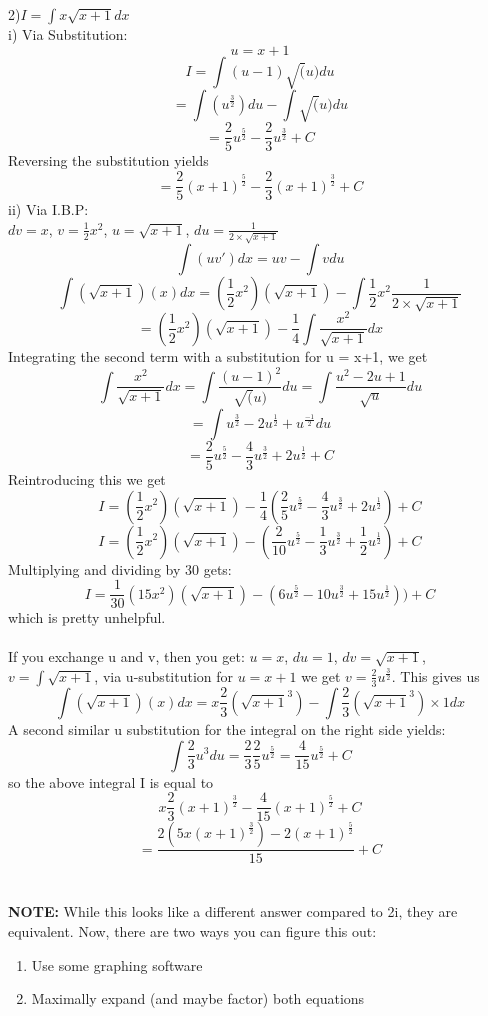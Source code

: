 \documentclass[twocolumn]{article}
\begin{document}
   2)$I = \int x \sqrt{x+1} dx $ \\
   i) Via Substitution:
   $$u = x+1$$
   $$I =\int(u-1)\sqrt(u) du$$
   $$= \int (u^{\frac{3}{2}}) du - \int \sqrt(u)du$$
   $$= \frac{2}{5} u^{\frac{5}{2}} - \frac {2}{3} u^{\frac{3}{2}} + C$$
   Reversing the substitution yields
   $$= \frac{2}{5} (x+1)^{\frac{5}{2}} - \frac {2}{3} (x+1)^{\frac{3}{2}} + C$$
   ii) Via I.B.P: \\
   $dv = x$, $v = \frac{1}{2}x^2$, $u = \sqrt{x+1}$, $du = \frac{1}{2\times \sqrt{x+1}}$
   $$\int(uv')dx = uv - \int vdu$$
   $$\int(\sqrt{x+1}) (x) dx = (\frac{1}{2}x^2)(\sqrt{x+1})-\int{\frac{1}{2}x^2} \frac{1}{2\times \sqrt{x+1}}$$
   $$= (\frac{1}{2}x^2)(\sqrt{x+1})-\frac{1}{4}\int \frac{x^2}{\sqrt{x+1}} dx$$
   Integrating the second term with a substitution for u = x+1, we get $$\int \frac{x^2}{\sqrt{x+1}}dx = \int \frac {(u-1)^2}{\sqrt(u)}du = \int \frac{u^2 - 2u + 1}{\sqrt{u}}du$$
   $$= \int u^\frac{3}{2} - 2u^\frac{1}{2} + u^\frac{-1}{2} du$$
   $$=\frac{2}{5}u^\frac{5}{2} - \frac{4}{3}u^\frac{3}{2} + 2u^\frac{1}{2} + C$$
   Reintroducing this we get
   $$I = (\frac{1}{2}x^2)(\sqrt{x+1}) - \frac{1}{4}(\frac{2}{5}u^\frac{5}{2} - \frac{4}{3}u^\frac{3}{2} + 2u^\frac{1}{2}) + C $$
   $$I = (\frac{1}{2}x^2)(\sqrt{x+1}) - (\frac{2}{10}u^\frac{5}{2} - \frac{1}{3}u^\frac{3}{2} + \frac{1}{2}u^\frac{1}{2}) +C  $$ Multiplying and dividing by 30 gets:
   $$I = \frac{1}{30}(15x^2)(\sqrt{x+1}) - (6u^\frac{5}{2} - 10u^\frac{3}{2} + 15u^\frac{1}{2})) + C$$
   which is pretty unhelpful. \\ \\If you exchange u and v, then you get:
   $u = x$, $du = 1$, $dv = \sqrt{x+1}$, $v = \int \sqrt{x+1}$, via u-substitution for $u=x+1$ we get $v = \frac{2}{3}u^\frac{3}{2}$. This gives us \\ $$\int(\sqrt{x+1}) (x) dx = x\frac {2}{3}(\sqrt{x+1}^3)-\int \frac {2}{3}(\sqrt{x+1}^3) \times 1 dx$$
   A second similar u substitution for the integral on the right side yields:
   $$\int\frac{2}{3}u^3 du = \frac{2}{3} \frac{2}{5} u^\frac{5}{2} = \frac{4}{15} u^\frac{5}{2} + C$$ so the above integral I is equal to
   $$x\frac {2}{3}(x+1)^\frac{3}{2}-\frac{4}{15} (x+1)^\frac{5}{2} + C$$
   $$= \frac{2(5x(x+1)^\frac{3}{2})-2(x+1)^\frac{5}{2}}{15} + C$$ \\\\
   \textbf{NOTE:}
   While this looks like a different answer compared to 2i, they are equivalent.  Now, there are two ways you can figure this out:
   \begin{enumerate}
     \item Use some graphing software
     \item Maximally expand (and maybe factor) both equations
   \end{enumerate}
\end{document}
